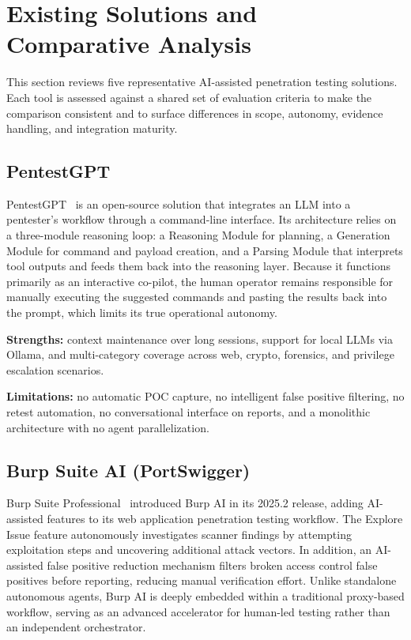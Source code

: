 \documentclass[12pt,a4paper]{report}
\begin{document}
\section{Existing Solutions and Comparative Analysis}

This section reviews five representative AI-assisted penetration testing solutions.
Each tool is assessed against a shared set of evaluation criteria to make the comparison
consistent and to surface differences in scope, autonomy, evidence handling, and integration maturity.

\subsection{PentestGPT}

PentestGPT~\cite{pentestgpt2023} is an open-source solution that integrates an LLM
into a pentester's workflow through a command-line interface. Its architecture relies on
a three-module reasoning loop: a Reasoning Module for planning, a Generation Module for
command and payload creation, and a Parsing Module that interprets tool outputs and
feeds them back into the reasoning layer. Because it functions primarily as an interactive co-pilot, the human operator remains responsible for manually executing the suggested commands and pasting the results back into the prompt, which limits its true operational autonomy.

\textbf{Strengths:} context maintenance over long sessions, support for local LLMs
via Ollama, and multi-category coverage across web, crypto, forensics, and privilege
escalation scenarios.

\textbf{Limitations:} no automatic POC capture, no intelligent false positive
filtering, no retest automation, no conversational interface on reports, and a
monolithic architecture with no agent parallelization.

\subsection{Burp Suite AI (PortSwigger)}

Burp Suite Professional~\cite{burpsuiteAI} introduced Burp AI in its 2025.2 release,
adding AI-assisted features to its web application penetration testing workflow. The
Explore Issue feature autonomously investigates scanner findings by attempting
exploitation steps and uncovering additional attack vectors. In addition, an
AI-assisted false positive reduction mechanism filters broken access control false
positives before reporting, reducing manual verification effort. Unlike standalone autonomous agents, Burp AI is deeply embedded within a traditional proxy-based workflow, serving as an advanced accelerator for human-led testing rather than an independent orchestrator.
\end{document}
